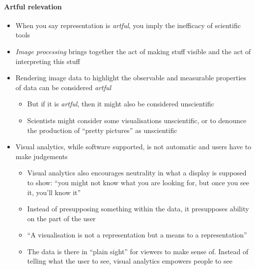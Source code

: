 \documentclass[a4paper]{article}
\begin{document}
\paragraph{Artful relevation}
\begin{itemize}
	\item When you say representation is \textit{artful}, you imply the inefficacy of scientific tools
	\item \textit{Image processing} brings together the act of making stuff visible and the act of interpreting this stuff 
	\item Rendering image data to highlight the observable and measurable properties of data can be considered \textit{artful}
	\begin{itemize}[label=$\circ$]
		\item But if it is \textit{artful}, then it might also be considered unscientific
		\item Scientists might consider some visualisations unscientific, or to denounce the production of ``pretty pictures'' as unscientific
	\end{itemize}
	\item Visual analytics, while software supported, is not automatic and users have to make judgements
	\begin{itemize}[label=$\circ$]
		\item Visual analytics also encourages neutrality in what a display is supposed to show: ``you might not know what you are looking for, but once you see it, you'll know it''
		\item Instead of presupposing something within the data, it presupposes ability on the part of the user
		\item ``A visualisation is not a representation but a means to a representation''
		\item The data is there in ``plain sight'' for viewers to make sense of. Instead of telling what the user to see, visual analytics empowers people to see
	\end{itemize}
\end{itemize}
\end{document}
